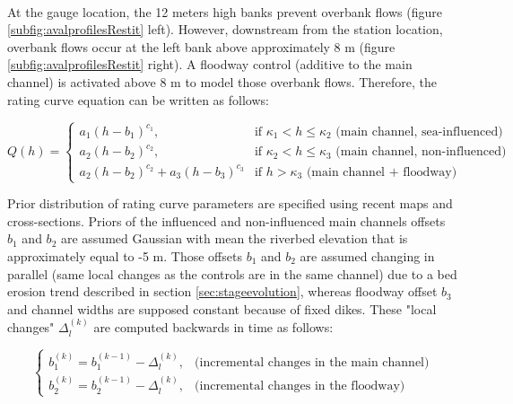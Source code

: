 \documentclass[11pt]{article}
\begin{document}
        \paragraph{}At the gauge location, the 12 meters high banks prevent overbank flows (figure \ref{subfig:avalprofilesRestit} left). However, downstream from the station location, overbank flows occur at the left bank above approximately 8 m (figure \ref{subfig:avalprofilesRestit} right). A floodway control (additive to the main channel) is activated above 8 m to model those overbank flows. Therefore, the rating curve equation can be written as follows: 
        
        \begin{equation}
        Q(h) =
          \begin{cases}
           a_1(h-b_1)^{c_1}, & \text{if $\kappa_1 < h \leq \kappa_2 $ (main channel, sea-influenced) }\\
           a_2(h-b_2)^{c_2}, & \text{if $\kappa_2 < h \leq \kappa_3 $ (main channel, non-influenced)}\\
           a_2(h-b_2)^{c_2}+ a_3(h-b_3)^{c_3} & \text{if $h > \kappa_3$ (main channel + floodway)}
          \end{cases}
          \label{eq:RcRes}
        \end{equation}

        Prior distribution of rating curve parameters are specified using recent maps and cross-sections. Priors of the influenced and non-influenced main channels offsets $b_1$ and $b_2$ are assumed Gaussian with mean the riverbed elevation that is approximately equal to -5 m. Those offsets $b_1$ and $b_2$ are assumed changing in parallel (same local changes as the controls are in the same channel) due to a bed erosion trend described in section \ref{sec:stageevolution}, whereas floodway offset $b_3$ and channel widths are supposed constant because of fixed dikes. These "local changes" $\Delta_l^{(k)}$ are computed backwards in time as follows: 

        \begin{equation}
          \begin{cases}
           b_1^{(k)} = b_1^{(k-1)}-\Delta_l^{(k)}, & \text{(incremental changes in the main channel)}\\
           b_2^{(k)} = b_2^{(k-1)}-\Delta_l^{(k)}, & \text{(incremental changes in the floodway)}
          \end{cases}
          \label{eq:SPD_Res}
        \end{equation}
        
\end{document}
